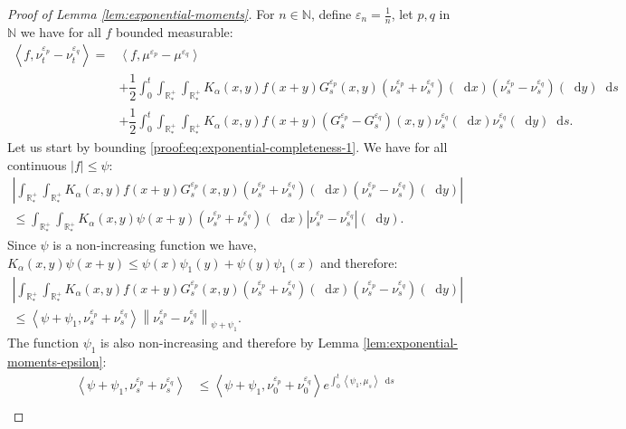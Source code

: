 \documentclass[11pt,a4paper]{article}
\newcommand{\NN}{\mathbb{N}}
\newcommand{\RRP}{\mathbb{R}^+_*}
\newcommand{\brac}[1]{\left\langle#1\right\rangle}
\newcommand{\dd}{\mathop{}\!\mathrm{d}}
\begin{document}
\begin{proof}[Proof of Lemma \ref{lem:exponential-moments}]
    For $n\in \NN$, define $\varepsilon_n = \frac1n$, let $p,q$ in $\NN$ we have for all $f$ bounded measurable:
    \begin{subequations}
    \begin{align}
        \brac{f,\nu_t^{\varepsilon_p}-\nu_t^{\varepsilon_q}} =& \brac{f,\mu^{\varepsilon_p} - \mu^{\varepsilon_q}} 
        \nonumber \\
        &+ \dfrac12\int_0^t \int_{\RRP}\int_{\RRP}K_\alpha(x,y)f(x+y) G^{\varepsilon_p}_s(x,y)(\nu_s^{\varepsilon_p} + \nu_s^{\varepsilon_q})(\dd x)(\nu_s^{\varepsilon_p} -\nu_s^{\varepsilon_q} )(\dd y)\dd s \label{proof:eq:exponential-completeness-1}\\
        &+ \dfrac12\int_0^t\int_{\RRP}\int_{\RRP}K_\alpha(x,y)f(x+y) (G^{\varepsilon_p}_s - G^{\varepsilon_q}_s)(x,y)\nu_s^{\varepsilon_q}(\dd x)\nu_s^{\varepsilon_q}(\dd y) \dd s.\label{proof:eq:exponential-completeness-2}
    \end{align}
    \label{proof:eq:exponential-completeness}
    \end{subequations}
    Let us start by bounding \eqref{proof:eq:exponential-completeness-1}. We have for all continuous $|f| \leq \psi$:
    \begin{multline*}
        \left|\int_{\RRP}\int_{\RRP}K_\alpha(x,y)f(x+y) G^{\varepsilon_p}_s(x,y)(\nu_s^{\varepsilon_p} + \nu_s^{\varepsilon_q})(\dd x)(\nu_s^{\varepsilon_p} -\nu_s^{\varepsilon_q} )(\dd y)\right| \\
        \leq \int_{\RRP}\int_{\RRP}K_\alpha(x,y)\psi(x+y) (\nu_s^{\varepsilon_p} + \nu_s^{\varepsilon_q})(\dd x)\left|\nu_s^{\varepsilon_p} -\nu_s^{\varepsilon_q} \right|(\dd y).
    \end{multline*}
    Since $\psi$ is a non-increasing function we have, $K_\alpha(x,y)\psi(x+y) \leq \psi(x)\psi_1(y) + \psi(y)\psi_1(x)$ and therefore:
    \begin{multline*}
        \left|\int_{\RRP}\int_{\RRP}K_\alpha(x,y)f(x+y) G^{\varepsilon_p}_s(x,y)(\nu_s^{\varepsilon_p} + \nu_s^{\varepsilon_q})(\dd x)\left(\nu_s^{\varepsilon_p} -\nu_s^{\varepsilon_q}\right)(\dd y)\right| \\
        \leq \brac{\psi + \psi_1, \nu_s^{\varepsilon_p} + \nu_s^{\varepsilon_q}} \left\|\nu_s^{\varepsilon_p} - \nu_s^{\varepsilon_q} \right\|_{\psi + \psi_1}.
    \end{multline*}
    The function $\psi_1$ is also non-increasing and therefore by Lemma \ref{lem:exponential-moments-epsilon}:
    \begin{align*}
        \brac{\psi + \psi_1, \nu_s^{\varepsilon_p} + \nu_s^{\varepsilon_q}} &\leq \brac{\psi + \psi_1, \nu_0^{\varepsilon_p} + \nu_0^{\varepsilon_q}} e^{\int_0^t \brac{\psi_1,\mu_s}\dd s}\\

\end{align*}
\end{proof}
\end{document}
